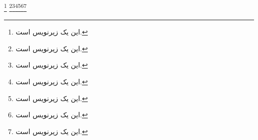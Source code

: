 \documentclass{article}
\begin{document}
\footnote{این یک زیرنویس است.}
\newpage
\setRTLparagraphfootnotes
\footnote{این یک زیرنویس است.}\footnote{این یک زیرنویس است.}\footnote{این یک زیرنویس است.}\footnote{این یک زیرنویس است.}\footnote{این یک زیرنویس است.}\footnote{این یک زیرنویس است.}
\end{document}
